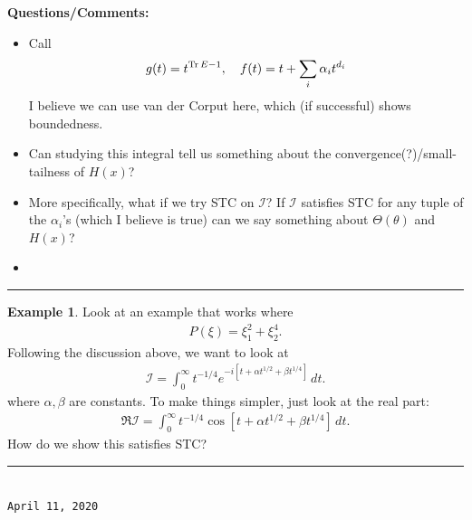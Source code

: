\documentclass{article}
\theoremstyle{definition}
\newtheorem{exmp}{Example}[section]
\newcommand{\al}{\alpha}
\newcommand{\be}{\beta}
\newcommand{\lb}{\left[}
\newcommand{\rb}{\right]}
\begin{document}
\textbf{Questions/Comments:}
\begin{itemize}
    \item Call
    \begin{align*}
        g(t) = t^{\Tr E - 1},\quad f(t) = t + \sum_{i} \al_i t^{d_i}
    \end{align*}
    I believe we can use van der Corput here, which (if successful) shows boundedness. 
    \item Can studying this integral tell us something about the convergence(?)/small-tailness of $H(x)$?
    \item More specifically, what if we try STC on $\mathcal{I}$? If $\mathcal{I}$ satisfies STC for any tuple of the $\al_i$'s (which I believe is true) can we say something about $\Theta(\theta)$ and $H(x)$? 
    \item 

\end{itemize}


\hrule


\begin{exmp}    
    Look at an example that works where
    \begin{align*}
        P(\xi) = \xi_1^2 + \xi_2^4.
    \end{align*}
    Following the discussion above, we want to look at 
    \begin{align*}
        \mathcal{I} = \int_0^\infty t^{-1/4}e^{-i\lb t + \al t^{1/2} + \be t^{1/4}\rb}\,dt.
    \end{align*}
    where $\al,\be$ are constants. To make things simpler, just look at the real part:
    \begin{align*}
    \Re{\mathcal{I}} = \int_0^\infty t^{-1/4}\cos\lb t + \al t^{1/2} + \be t^{1/4}\rb\,dt.
    \end{align*}
    How do we show this satisfies STC? 
    
\end{exmp}

\hrule
$\,$\\

\texttt{April 11, 2020}\\
\end{document}

